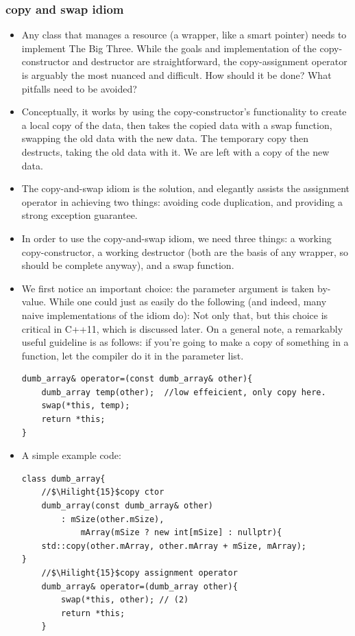 \documentclass[a4paper,11pt,twoside]{book}
\newcommand{\Hilight}[1]{\makebox[0pt][l]{\color{yellow}\rule[-3pt]{#1em}{11pt}}}
\newcommand{\Hilight}[1]{}
\begin{document}
\subsubsection{copy and swap idiom}
\begin{itemize}
	\item Any class that manages a resource (a wrapper, like a smart pointer) needs to implement The Big Three. While the goals and implementation of the copy-constructor and destructor are straightforward, the copy-assignment operator is arguably the most nuanced and difficult. How should it be done? What pitfalls need to be avoided?
	
	\item Conceptually, it works by using the copy-constructor's functionality to create a local copy of the data, then takes the copied data with a swap function, swapping the old data with the new data. The temporary copy then destructs, taking the old data with it. We are left with a copy of the new data.
	
	\item The copy-and-swap idiom is the solution, and elegantly assists the assignment operator in achieving two things: avoiding code duplication, and providing a strong exception guarantee.
	
	\item In order to use the copy-and-swap idiom, we need three things: a working copy-constructor, a working destructor (both are the basis of any wrapper, so should be complete anyway), and a swap function.
	
	\item We first notice an important choice: the parameter argument is taken by-value. While one could just as easily do the following (and indeed, many naive implementations of the idiom do): Not only that, but this choice is critical in C++11, which is discussed later. On a general note, a remarkably useful guideline is as follows: if you're going to make a copy of something in a function, let the compiler do it in the parameter list.
	
\begin{lstlisting}
dumb_array& operator=(const dumb_array& other){
	dumb_array temp(other);  //low effeicient, only copy here.
	swap(*this, temp);
	return *this;
}
\end{lstlisting}

\item A simple example code:
\begin{lstlisting}
class dumb_array{
	//$\Hilight{15}$copy ctor
	dumb_array(const dumb_array& other)
		: mSize(other.mSize),
			mArray(mSize ? new int[mSize] : nullptr){
	std::copy(other.mArray, other.mArray + mSize, mArray);
}
	//$\Hilight{15}$copy assignment operator
	dumb_array& operator=(dumb_array other){
		swap(*this, other); // (2)
		return *this;
	}


\end{lstlisting}
\end{itemize}
\end{document}
